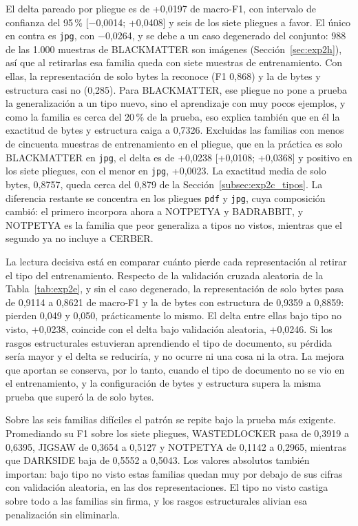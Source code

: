 El delta pareado por pliegue es de +0,0197 de macro-F1, con intervalo de confianza del 95\,\% [$-$0,0014; +0,0408] y seis de los siete pliegues a favor. El único en contra es \texttt{jpg}, con $-$0,0264, y se debe a un caso degenerado del conjunto: 988 de las 1.000 muestras de BLACKMATTER son imágenes (Sección~\ref{sec:exp2h}), así que al retirarlas esa familia queda con siete muestras de entrenamiento. Con ellas, la representación de solo bytes la reconoce (F1 0,868) y la de bytes y estructura casi no (0,285). Para BLACKMATTER, ese pliegue no pone a prueba la generalización a un tipo nuevo, sino el aprendizaje con muy pocos ejemplos, y como la familia es cerca del 20\,\% de la prueba, eso explica también que en él la exactitud de bytes y estructura caiga a 0,7326. Excluidas las familias con menos de cincuenta muestras de entrenamiento en el pliegue, que en la práctica es solo BLACKMATTER en \texttt{jpg}, el delta es de +0,0238 [+0,0108; +0,0368] y positivo en los siete pliegues, con el menor en \texttt{jpg}, +0,0023. La exactitud media de solo bytes, 0,8757, queda cerca del 0,879 de la Sección~\ref{subsec:exp2c_tipos}. La diferencia restante se concentra en los pliegues \texttt{pdf} y \texttt{jpg}, cuya composición cambió: el primero incorpora ahora a NOTPETYA y BADRABBIT, y NOTPETYA es la familia que peor generaliza a tipos no vistos, mientras que el segundo ya no incluye a CERBER.

La lectura decisiva está en comparar cuánto pierde cada representación al retirar el tipo del entrenamiento. Respecto de la validación cruzada aleatoria de la Tabla~\ref{tab:exp2e}, y sin el caso degenerado, la representación de solo bytes pasa de 0,9114 a 0,8621 de macro-F1 y la de bytes con estructura de 0,9359 a 0,8859: pierden 0,049 y 0,050, prácticamente lo mismo. El delta entre ellas bajo tipo no visto, +0,0238, coincide con el delta bajo validación aleatoria, +0,0246. Si los rasgos estructurales estuvieran aprendiendo el tipo de documento, su pérdida sería mayor y el delta se reduciría, y no ocurre ni una cosa ni la otra. La mejora que aportan se conserva, por lo tanto, cuando el tipo de documento no se vio en el entrenamiento, y la configuración de bytes y estructura supera la misma prueba que superó la de solo bytes.

Sobre las seis familias difíciles el patrón se repite bajo la prueba más exigente. Promediando su F1 sobre los siete pliegues, WASTEDLOCKER pasa de 0,3919 a 0,6395, JIGSAW de 0,3654 a 0,5127 y NOTPETYA de 0,1142 a 0,2965, mientras que DARKSIDE baja de 0,5552 a 0,5043. Los valores absolutos también importan: bajo tipo no visto estas familias quedan muy por debajo de sus cifras con validación aleatoria, en las dos representaciones. El tipo no visto castiga sobre todo a las familias sin firma, y los rasgos estructurales alivian esa penalización sin eliminarla.


